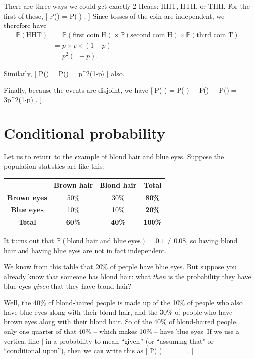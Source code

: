 \documentclass[
  letterpaper,
  DIV=11,
  numbers=noendperiod]{scrreprt}
\theoremstyle{remark}
\begin{document}
There are three ways we could get exactly 2 Heads: HHT, HTH, or THH. For
the first of these, {[} \mathbb P() =
\mathbb P( \cap {}
\cap {}) . {]} Since tosses of the coin are
independent, we therefore have \begin{align*}
\mathbb P(\text{HHT})
  &= \mathbb P(\text{first coin H}) \times \mathbb P ( \text{second coin H} )\times \mathbb P(\text{third coin T}) \\
  &=p \times p \times (1-p) \\
  &= p^2(1-p).
\end{align*}

Similarly, {[} \mathbb P() = \mathbb P() =
p\^{}2(1-p) {]} also.

Finally, because the events are disjoint, we have {[}
\mathbb P( \cup{} \cup {}) =
\mathbb P( ) + \mathbb P() + \mathbb P() =
3p\^{}2(1-p) . {]}

\hypertarget{conditional}{%
\section{Conditional probability}\label{conditional}}

Let us to return to the example of blond hair and blue eyes. Suppose the
population statistics are like this:

\begin{longtable}[]{@{}cccc@{}}
\toprule()
& \textbf{Brown hair} & \textbf{Blond hair} & \textbf{Total} \\
\midrule()
\endhead
\textbf{Brown eyes} & 50\% & 30\% & \textbf{80\%} \\
\textbf{Blue eyes} & 10\% & 10\% & \textbf{20\%} \\
\textbf{Total} & \textbf{60\%} & \textbf{40\%} & \textbf{100\%} \\
\bottomrule()
\end{longtable}

It turns out that
\(\mathbb P(\text{blond hair and blue eyes}) = 0.1 \neq 0.08\), so
having blond hair and having blue eyes are not in fact independent.

We know from this table that 20\% of people have blue eyes. But suppose
you already know that someone has blond hair: what \emph{then} is the
probability they have blue eyes \emph{given} that they have blond hair?

Well, the 40\% of blond-haired people is made up of the 10\% of people
who also have blue eyes along with their blond hair, and the 30\% of
people who have brown eyes along with their blond hair. So of the 40\%
of blond-haired people, only one quarter of that 40\% -- which makes
10\% -- have blue eyes. If we use a vertical line \(|\) in a probability
to mean ``given'' (or ``assuming that'' or ``conditional upon''), then
we can write this as {[} \mathbb P(
\mid {}) =
=  = . {]}
\end{document}

